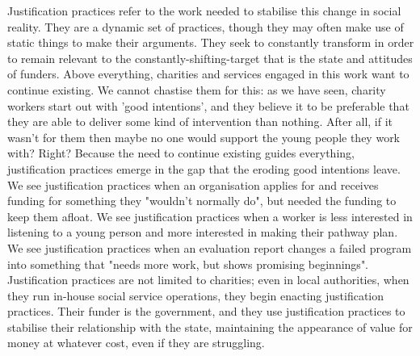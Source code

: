 Justification practices refer to the work needed to stabilise this change in social reality. They are a dynamic set of practices, though they may often make use of static things to make their arguments. They seek to constantly transform in order to remain relevant to the constantly-shifting-target that is the state and attitudes of funders. Above everything, charities and services engaged in this work want to continue existing. We cannot chastise them for this: as we have seen, charity workers start out with 'good intentions', and they believe it to be preferable that they are able to deliver some kind of intervention than nothing. After all, if it wasn't for them then maybe no one would support the young people they work with? Right? Because the need to continue existing guides everything, justification practices emerge in the gap that the eroding good intentions leave. We see justification practices when an organisation applies for and receives funding for something they "wouldn't normally do", but needed the funding to keep them afloat. We see justification practices when a worker is less interested in listening to a young person and more interested in making their pathway plan. We see justification practices when an evaluation report changes a failed program into something that "needs more work, but shows promising beginnings". Justification practices are not limited to charities; even in local authorities, when they run in-house social service operations, they begin enacting justification practices. Their funder is the government, and they use justification practices to stabilise their relationship with the state, maintaining the appearance of value for money at whatever cost, even if they are struggling.

